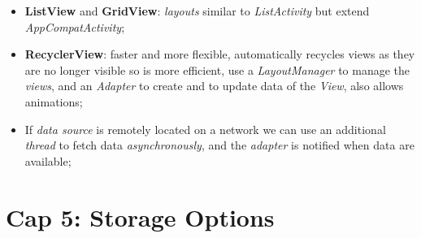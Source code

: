 \documentclass{article}
\begin{document}
\begin{itemize}
\begin{itemize}
\item \textbf{ListView} and \textbf{GridView}: \emph{layouts} similar to \emph{ListActivity} but extend \emph{AppCompatActivity};
\item \textbf{RecyclerView}: faster and more flexible, automatically recycles views as they are no longer visible so is more efficient, use a \emph{LayoutManager} to manage the \emph{views}, and an \emph{Adapter} to create and to update data of the \emph{View}, also allows animations;
\item If \emph{data source} is remotely located on a network we can use an additional \emph{thread} to fetch data \emph{asynchronously}, and the \emph{adapter} is notified when data are available;
\end{itemize}
\end{itemize}
\section{Cap 5: Storage Options}
\end{document}
